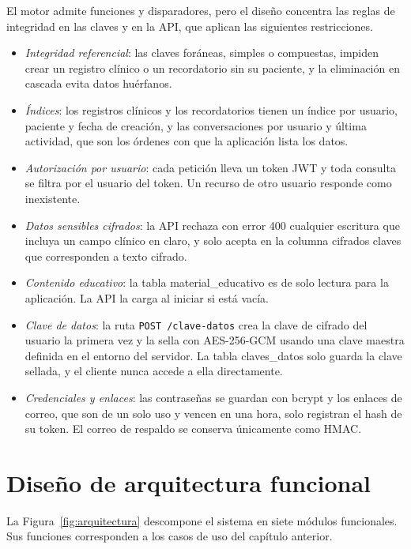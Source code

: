 El motor admite funciones y disparadores, pero el diseño concentra las reglas de
integridad en las claves y en la API, que aplican las siguientes restricciones.

\begin{itemize}
    \item \emph{Integridad referencial}: las claves foráneas, simples o
    compuestas, impiden crear un registro clínico o un recordatorio sin su
    paciente, y la eliminación en cascada evita datos huérfanos.
    \item \emph{Índices}: los registros clínicos y los recordatorios tienen un
    índice por usuario, paciente y fecha de creación, y las conversaciones por
    usuario y última actividad, que son los órdenes con que la aplicación
    lista los datos.
    \item \emph{Autorización por usuario}: cada petición lleva un token JWT y
    toda consulta se filtra por el usuario del token. Un recurso de otro
    usuario responde como inexistente.
    \item \emph{Datos sensibles cifrados}: la API rechaza con error 400 cualquier
    escritura que incluya un campo clínico en claro, y solo acepta en la columna
    cifrados claves que corresponden a texto cifrado.
    \item \emph{Contenido educativo}: la tabla material\_educativo es de solo
    lectura para la aplicación. La API la carga al iniciar si está vacía.
    \item \emph{Clave de datos}: la ruta \texttt{POST /clave-datos} crea la clave
    de cifrado del usuario la primera vez y la sella con AES-256-GCM usando una
    clave maestra definida en el entorno del servidor. La tabla claves\_datos
    solo guarda la clave sellada, y el cliente nunca accede a ella directamente.
    \item \emph{Credenciales y enlaces}: las contraseñas se guardan con bcrypt y
    los enlaces de correo, que son de un solo uso y vencen en una hora, solo
    registran el hash de su token. El correo de respaldo se conserva únicamente
    como HMAC.
\end{itemize}

\section[Diseño de Arquitectura Funcional]{Diseño de arquitectura funcional}

La Figura~\ref{fig:arquitectura} descompone el sistema en siete módulos
funcionales. Sus funciones corresponden a los casos de uso del capítulo
anterior.


